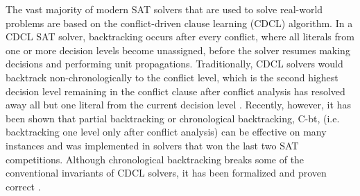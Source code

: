 \documentclass[runningheads]{llncs}
\renewcommand{\note}[1]{{\color{red}{#1}}}
\newcommand{\cbt}{C-bt\xspace}
\begin{document}






The vast majority of modern SAT solvers that are used to solve
real-world problems are based on the conflict-driven clause learning
(CDCL) algorithm. In a CDCL SAT solver, backtracking occurs after
every conflict, where all literals from one or more decision levels
become unassigned, before the solver resumes making decisions and
performing unit propagations. Traditionally, CDCL solvers would
backtrack non-chronologically to the conflict level, which is the
second highest decision level remaining in the conflict clause after
conflict analysis has resolved away all but one literal from the
current decision level \cite{DBLP:conf/dac/MoskewiczMZZM01}. Recently,
however, it has been shown that partial backtracking
\cite{DBLP:conf/lpar/JiangZ13} or chronological backtracking, \cbt,
(i.e. backtracking one level only after conflict analysis)
\cite{DBLP:conf/sat/NadelR18,DBLP:conf/sat/MohleB19} can be effective
on many instances and was implemented in solvers that won the last two
SAT competitions. Although chronological backtracking breaks some of
the conventional invariants of CDCL solvers, it has been formalized
and proven correct \cite{DBLP:conf/sat/MohleB19}.
\end{document}
